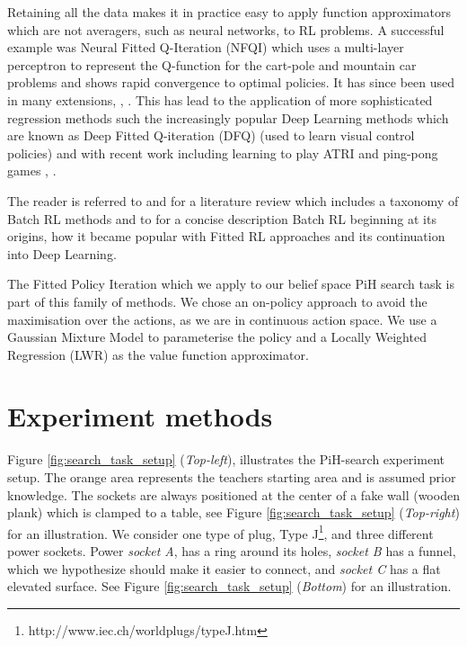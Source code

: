 \documentclass[final,3p,times,twocolumn]{elsarticle}
\begin{document}
Retaining all the data makes it in practice easy to apply function approximators which are not averagers, such as neural networks,
to RL problems. A successful example was Neural Fitted Q-Iteration (NFQI) \cite{Riedmiller2005} which 
uses a multi-layer perceptron to represent the Q-function for the cart-pole and mountain car problems and 
shows rapid convergence to optimal policies. It has since been used in many extensions, \cite{NAC_2008}, \cite{rl_gmm_2010}.
This has lead to the application of more sophisticated regression methods such the increasingly popular Deep Learning methods 
which are known as Deep Fitted Q-iteration (DFQ) \cite{Lange_riedmiller_2010} (used to learn visual control policies) 
and with recent work including learning to play ATRI and ping-pong games \cite{mnih-dqn-2015}, \cite{DRQ_AAAI_2015}. 

The reader is referred to \cite{approx_rl_overview_2011} and \cite[Chap 2]{RL_state_art_2012} for a literature 
review which includes a taxonomy of Batch RL methods and to  for a concise description Batch RL beginning at 
its origins, how it became popular with Fitted RL approaches and its continuation into Deep Learning.

The Fitted Policy Iteration which we apply to our belief space PiH search task is part of this family of methods.
We chose an on-policy approach to avoid the maximisation over the actions, as we are in continuous action space.
We use a Gaussian Mixture Model to parameterise the policy and a Locally Weighted Regression (LWR) as 
the value function approximator.


\section{Experiment methods}\label{sec:experiment_methods}

Figure \ref{fig:search_task_setup} (\textit{Top-left}), illustrates the PiH-search experiment setup. The orange area represents 
the teachers starting area and is assumed prior knowledge. The sockets are always positioned at the center of a fake wall (wooden plank) which is clamped to a table, see 
Figure \ref{fig:search_task_setup} (\textit{Top-right}) for an illustration. 
We consider one type of plug, Type J\footnote{http://www.iec.ch/worldplugs/typeJ.htm}, and three different power sockets. 
Power \textit{socket A}, has a ring around its holes, \textit{socket B} has a funnel, which we hypothesize should make 
it easier to connect, and \textit{socket C} has a flat elevated surface. See Figure \ref{fig:search_task_setup}
(\textit{Bottom}) for an illustration. 
\end{document}
